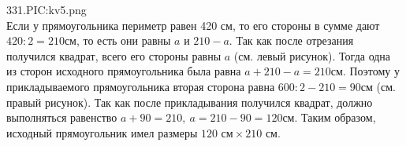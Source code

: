 331.{{PIC:kv5.png}}\\
Если у прямоугольника периметр равен 420 см, то его стороны в сумме дают $420:2=210$см, то есть они равны $a$ и $210-a.$ Так как после отрезания получился квадрат, всего его стороны равны $a$ (см. левый рисунок). Тогда одна из сторон исходного прямоугольника была равна $a+210-a=210$см. Поэтому у прикладываемого прямоугольника вторая сторона равна $600:2-210=90$см (см. правый рисунок). Так как после прикладывания получился квадрат, должно выполняться равенство $a+90=210,\ a=210-90=120$см. Таким образом, исходный прямоугольник имел размеры $120\text{ см}\times210\text{ см}.$\\

